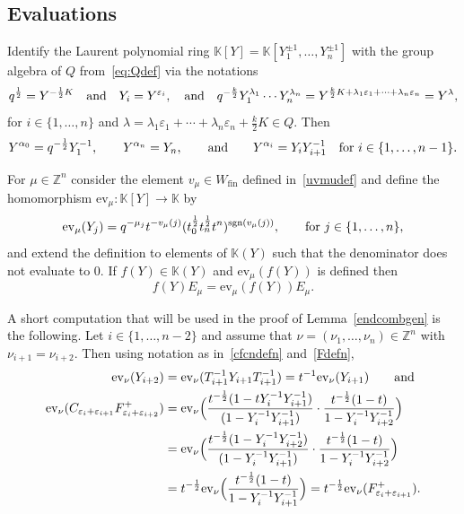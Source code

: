 \documentclass[11pt]{article}
\theoremstyle{plain}
\theoremstyle{definition}
\newenvironment{example}
  {\pushQED{\qed}\exampleinner}
  {\popQED\endexampleinner}
\theoremstyle{remark}
\numberwithin{equation}{section}
\def\KK{\mathbb{K}}
\def\ZZ{\mathbb{Z}}
\def\ev{\mathrm{ev}}
\newcounter{r}
\newcounter{s}
\begin{document}
\subsection{Evaluations}

Identify the Laurent polynomial ring $\KK[Y] = \KK[Y_1^{\pm1}, \ldots, Y_n^{\pm1}]$
with the group algebra of $Q$ from~\eqref{eq:Qdef} 
via the notations
\begin{equation}
q^{\frac12} = Y^{-\frac12 K} \quad\hbox{and}\quad
Y_i = Y^{\varepsilon_i},
\quad\hbox{and}\quad
q^{-\frac{k}{2}} Y_1^{\lambda_1}\cdots Y_n^{\lambda_n}
=Y^{\frac{k}{2}K+\lambda_1\varepsilon_1+\cdots+\lambda_n\varepsilon_n}=Y^{\lambda},
\label{Ynot}
\end{equation}
for $i\in \{1, \ldots, n\}$ and $\lambda 
= \lambda_1\varepsilon_1+\cdots+\lambda_n\varepsilon_n+\frac{k}{2}K
\in  Q$. 
Then
\begin{equation}
Y^{\alpha_0} = q^{-\frac12} Y_1^{-1}, \qquad
Y^{\alpha_n} = Y_n, \qquad \hbox{and}\qquad
Y^{\alpha_i} = Y_iY^{-1}_{i+1}\quad\hbox{for $i\in \{1, \ldots, n-1\}$.}
\label{Ysroots}
\end{equation}

For $\mu\in \ZZ^n$ consider the element $v_\mu\in W_{\mathrm{fin}}$ defined in~\eqref{uvmudef} and
define the homomorphism $\ev_\mu \colon \KK[Y] \longrightarrow  \KK$ by
\begin{equation}
\ev_\mu(Y_j) = q^{-\mu_j} t^{-v_\mu(j)} (t_0^{\frac12}t_n^{\frac12}t^n)^{\mathrm{sgn}(v_\mu(j))},
\qquad\hbox{for $j\in \{1, \ldots, n\}$,}
\label{evhomdefn}
\end{equation}
and extend the definition to elements of $\KK(Y)$ such that the denominator does not evaluate to $0$.
If $f(Y)\in \KK(Y)$ and $\ev_\mu(f(Y))$ is defined then
$$f(Y)E_\mu = \ev_\mu(f(Y))E_\mu.$$

\begin{example} \label{CFshrink}
A short computation that will be used in the proof of Lemma~\ref{endcombgen} is the following.  
Let $i\in \{1, \ldots, n-2\}$ and assume that $\nu=(\nu_1, \ldots, \nu_n)\in \ZZ^n$ with $\nu_{i+1}=\nu_{i+2}$.  
Then using notation as in~\eqref{cfcndefn} and~\eqref{Fdefn},
\begin{align*}
\ev_\nu(Y_{i+2}) &= \ev_\nu(T_{i+1}^{-1}Y_{i+1}T_{i+1}^{-1})=t^{-1}\ev_\nu(Y_{i+1})\qquad\hbox{and} \\
\ev_\nu(C_{\varepsilon_i+\varepsilon_{i+1}}F^+_{\varepsilon_i+\varepsilon_{i+2}})
&= \ev_\nu\Big(\frac{t^{-\frac12}(1-tY_i^{-1}Y_{i+1}^{-1})}{(1-Y_i^{-1}Y_{i+1}^{-1})}\cdot \frac{t^{-\frac12}(1-t)}{1-Y_i^{-1}Y_{i+2}^{-1}}\Big)
\\
&= \ev_\nu\Big(\frac{t^{-\frac12}(1-Y_i^{-1}Y_{i+2}^{-1})}{(1-Y_i^{-1}Y_{i+1}^{-1})}\cdot \frac{t^{-\frac12}(1-t)}{1-Y_i^{-1}Y_{i+2}^{-1}}\Big)
\\
&= t^{-\frac12}\ev_\nu\Big(\frac{t^{-\frac12}(1-t)}{1-Y_i^{-1}Y_{i+1}^{-1}}\Big)
= t^{-\frac12}\ev_\nu(F^+_{\varepsilon_i+\varepsilon_{i+1}}).
\end{align*}
\end{example}
\end{document}
